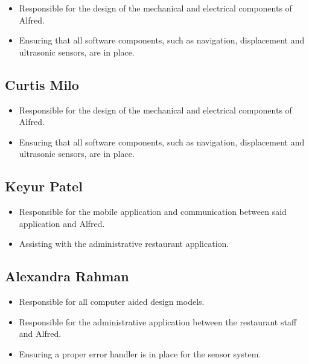\documentclass [10pt]{article}
\begin{document}
	\begin{itemize}
		\item Responsible for the design of the mechanical and electrical components of Alfred.
		\item Ensuring that all software components, such as navigation, displacement and ultrasonic sensors, are in place.
	\end{itemize}

\subsection{Curtis Milo}

\begin{itemize}
		\item Responsible for the design of the mechanical and electrical components of Alfred.
		\item Ensuring that all software components, such as navigation, displacement and ultrasonic sensors, are in place.
	\end{itemize}

\subsection{Keyur Patel}

	\begin{itemize}
		\item Responsible for the mobile application and communication between said application and Alfred.
		\item Assisting with the administrative restaurant application.
	\end{itemize} 

\subsection{Alexandra Rahman}

	\begin{itemize}
		\item Responsible for all computer aided design models.
		\item Responsible for the administrative application between the restaurant staff and Alfred.
		\item Ensuring a proper error handler is in place for the sensor system.
	\end{itemize}

\end{document}

